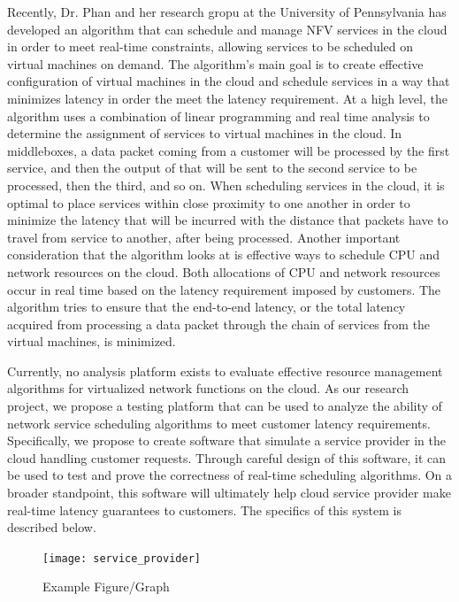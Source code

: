 \documentclass{sig-alternate}
\begin{document}
Recently, Dr. Phan and her research gropu at the University of Pennsylvania has developed an algorithm that can schedule and manage NFV services in the cloud in order to meet real-time constraints, allowing services to be scheduled on virtual machines on demand. The algorithm's main goal is to create effective configuration of virtual machines in the cloud and schedule services in a way that minimizes latency in order the meet the latency requirement. At a high level, the algorithm uses a combination of linear programming and real time analysis to determine the assignment of services to virtual machines in the cloud. In middleboxes, a data packet coming from a customer will be processed by the first service, and then the output of that will be sent to the second service to be processed, then the third, and so on. When scheduling services in the cloud, it is optimal to place services within close proximity to one another in order to minimize the latency that will be incurred with the distance that packets have to travel from service to another, after being processed. Another important consideration that the algorithm looks at is effective ways to schedule CPU and network resources on the cloud. Both allocations of CPU and network resources occur in real time based on the latency requirement imposed by customers. The algorithm tries to ensure that the end-to-end latency, or the total latency acquired from processing a data packet through the chain of services from the virtual machines, is minimized.

Currently, no analysis platform exists to evaluate effective resource management algorithms for virtualized network functions on the cloud. As our research project, we propose a testing platform that can be used to analyze the ability of network service scheduling algorithms to meet customer latency requirements. Specifically, we propose to create software that simulate a service provider in the cloud handling customer requests. Through careful design of this software, it can be used to test and prove the correctness of real-time scheduling algorithms. On a broader standpoint, this software will ultimately help cloud service provider make real-time latency guarantees to customers. The specifics of this system is described below.


\begin{figure}[htb!]
  \begin{center}
    \texttt{[image: service\_provider]}
  \end{center}
  \vspace{-12pt}
  \caption{Example Figure/Graph}
  \label{fig:some_graph}
\end{figure}
\end{document}
